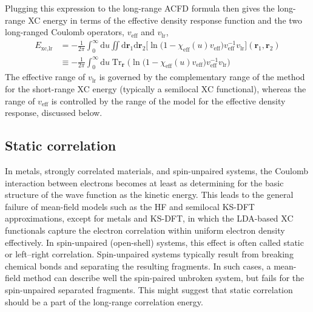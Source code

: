 Plugging this expression to the long-range ACFD formula then gives the long-range XC energy in terms of the effective density response function and the two long-ranged Coulomb operators, $v_\text{eff}$ and $v_\text{lr}$,
\begin{equation}
\begin{aligned}
  E_\text{xc,lr}&=-\frac1{2\pi}\int_0^\infty\mathrm du\iint\mathrm d\mathbf r_1\mathrm d\mathbf r_2\big[\ln\big(1-\chi_\text{eff}(u)v_\text{eff}\big)v_\text{eff}^{-1}v_\text{lr}\big](\mathbf r_1,\mathbf r_2) \\
  &\equiv-\frac1{2\pi}\int_0^\infty\mathrm du\operatorname{Tr}_{\mathbf r}\Big(\ln\big(1-\chi_\text{eff}(u)v_\text{eff}\big)v_\text{eff}^{-1}v_\text{lr}\Big)
\end{aligned}
\end{equation}
The effective range of $v_\text{lr}$ is governed by the complementary range of the method for the short-range XC energy (typically a semilocal XC functional), whereas the range of $v_\text{eff}$ is controlled by the range of the model for the effective density response, discussed below.

\subsection{Static correlation}

In metals, strongly correlated materials, and spin-unpaired systems, the Coulomb interaction between electrons becomes at least as determining for the basic structure of the wave function as the kinetic energy.
This leads to the general failure of mean-field models such as the HF and semilocal KS-DFT approximations, except for metals and KS-DFT, in which the LDA-based XC functionals capture the electron correlation within uniform electron density effectively.
In spin-unpaired (open-shell) systems, this effect is often called static or left--right correlation.
Spin-unpaired systems typically result from breaking chemical bonds and separating the resulting fragments.
In such cases, a mean-field method can describe well the spin-paired unbroken system, but fails for the spin-unpaired separated fragments.
This might suggest that static correlation should be a part of the long-range correlation energy.

